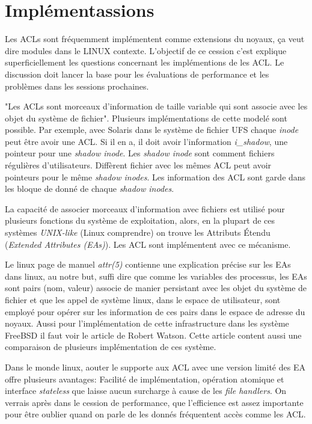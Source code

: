 \section{Implémentassions}

Les ACLs sont fréquemment implémentent comme extensions du noyaux, ça veut dire modules dans le LINUX contexte. L'objectif de ce cession c'est explique superficiellement les questions concernant les implémentions de les ACL. Le discussion doit lancer la base pour les évaluations de performance et les problèmes dans les sessions prochaines.

"Les ACLs sont morceaux d'information de taille variable qui sont associe avec les objet du système de fichier"\cite{aclsuse}. Plusieurs implémentations de cette modelé sont possible. Par exemple, avec Solaris dans le système de fichier UFS\cite{acl_permission} chaque \emph{inode} peut être avoir une ACL. Si il en a, il doit avoir l'information \emph{i\_shadow}, une pointeur pour une \emph{shadow inode}. Les \emph{shadow inode} sont comment fichiers régulières d'utilisateurs. Diffèrent fichier avec les mêmes ACL peut avoir pointeurs pour le même \emph{shadow inodes}. Les information des ACL sont garde dans les bloque de donné de chaque \emph{shadow inodes}.

La capacité de associer morceaux d'information avec fichiers est utilisé pour plusieurs fonctions du système de exploitation, alors, en la plupart de ces systèmes \emph{UNIX-like} (Linux comprendre) on trouve les Attributs Étendu (\emph{Extended Attributes (EAs)}). Les ACL sont implémentent avec ce mécanisme.

Le linux page de manuel\cite{aclsuse} \emph{attr(5)} contienne une explication précise sur les EAs dans linux, au notre but, suffi dire que comme les variables des processus, les EAs sont pairs (nom, valeur) associe de manier persistant avec les objet du système de fichier et que les appel de système linux, dans le espace de utilisateur, sont employé pour opérer sur les information de ces pairs dans le espace de adresse du noyaux. Aussi pour l'implémentation de cette infrastructure dans les système FreeBSD il faut voir le article de Robert Watson\cite{trust}. Cette article content aussi une comparaison de plusieurs implémentation de ces système. 

Dans le monde linux, aouter le supporte aux ACL avec une version limité des EA offre plusieurs avantages: Facilité de implémentation, opération atomique et interface \emph{stateless} que laisse aucun surcharge à cause de les \emph{file handlers}. On verrais après dans le cession de performance, que l'efficience est assez importante pour être oublier quand on parle de les donnés fréquentent accès comme les ACL.   

